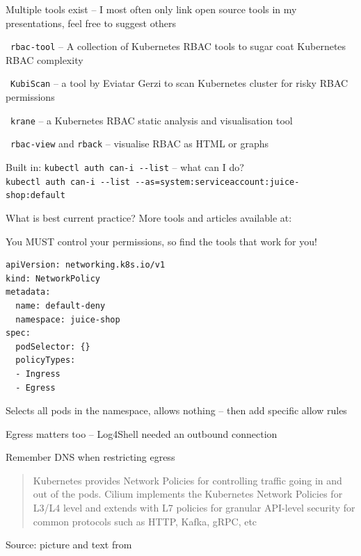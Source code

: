 \documentclass[Screen16to9,17pt]{foils}
\begin{document}
Multiple tools exist -- I most often only link open source tools in my presentations, feel free to suggest others
\begin{list2}
\item \faWrench\ \verb+rbac-tool+ -- A collection of Kubernetes RBAC tools to sugar coat Kubernetes RBAC complexity\\

\item \faWrench\ \verb+KubiScan+ -- a tool by Eviatar Gerzi to scan Kubernetes cluster for risky RBAC permissions 
\item \faWrench\ \verb+krane+ -- a Kubernetes RBAC static analysis and visualisation tool 
\item \faWrench\ \verb+rbac-view+ and \verb+rback+ -- visualise RBAC as HTML or graphs
\item Built in: \verb+kubectl auth can-i --list+ -- what can I do?\\
\verb+kubectl auth can-i --list --as=system:serviceaccount:juice-shop:default+
\item What is best current practice? More tools and articles available at:
\end{list2}

You MUST control your permissions, so find the tools that work for you!



\begin{verbatim}
apiVersion: networking.k8s.io/v1
kind: NetworkPolicy
metadata:
  name: default-deny
  namespace: juice-shop
spec:
  podSelector: {}
  policyTypes:
  - Ingress
  - Egress
\end{verbatim}

\begin{list2}
\item Selects all pods in the namespace, allows nothing -- then add specific allow rules
\item Egress matters too -- Log4Shell needed an outbound connection
\item Remember DNS when restricting egress
\end{list2}



\begin{quote}
Kubernetes provides Network Policies for controlling traffic going in and out of the pods. Cilium implements the Kubernetes Network Policies for L3/L4 level and extends with L7 policies for granular API-level security for common protocols such as HTTP, Kafka, gRPC, etc
\end{quote}
Source: picture and text from 
\end{document}
